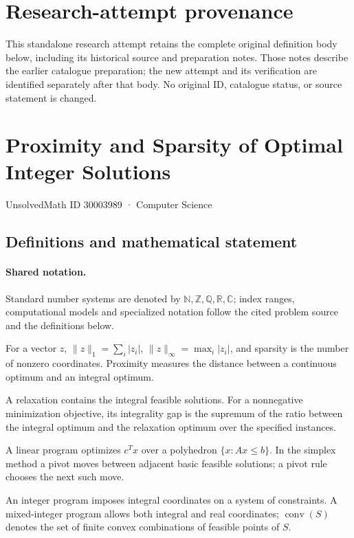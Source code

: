 \documentclass[11pt]{article}
\begin{document}
\section*{Research-attempt provenance}
This standalone research attempt retains the complete original definition body below,
including its historical source and preparation notes. Those notes describe the
earlier catalogue preparation; the new attempt and its verification are identified
separately after that body. No original ID, catalogue status, or source statement is changed.

\section{Proximity and Sparsity of Optimal Integer Solutions}\label{30003989}
{\small UnsolvedMath ID 30003989 · Computer Science}
\subsection{Definitions and mathematical statement}

\paragraph{Shared notation.}Standard number systems are denoted by $\mathbb N,\mathbb Z,\mathbb Q,\mathbb R,\mathbb C$; index ranges, computational models and specialized notation follow the cited problem source and the definitions below.


For a vector $z$, $\lVert z\rVert_1=\sum_i|z_i|$, $\lVert z\rVert_\infty=\max_i|z_i|$, and sparsity is the number of nonzero coordinates. Proximity measures the distance between a continuous optimum and an integral optimum.

A relaxation contains the integral feasible solutions. For a nonnegative minimization objective, its integrality gap is the supremum of the ratio between the integral optimum and the relaxation optimum over the specified instances.

A linear program optimizes $c^Tx$ over a polyhedron $\{x:Ax\leq b\}$. In the simplex method a pivot moves between adjacent basic feasible solutions; a pivot rule chooses the next such move.

An integer program imposes integral coordinates on a system of constraints. A mixed-integer program allows both integral and real coordinates; $\operatorname{conv}(S)$ denotes the set of finite convex combinations of feasible points of $S$.
\end{document}
